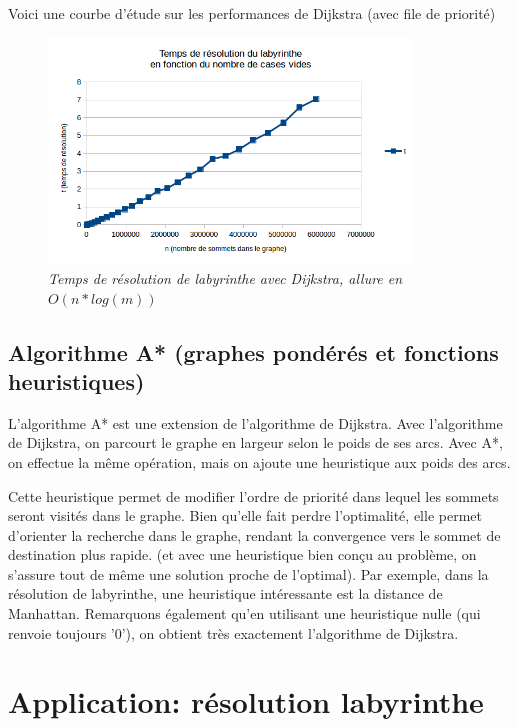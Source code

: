 \documentclass[10pt]{article}
\begin{document}
				Voici une courbe d'étude sur les performances de Dijkstra (avec file de priorité)
				\begin{figure}[H]
					\begin{center}
						\includegraphics[height=6cm,keepaspectratio]{./images/courbe_temps.png}
					\end{center}
					\caption{\textit{Temps de résolution de labyrinthe avec Dijkstra, allure en \(O(n * log(m))\)}}
					\label{courbe_temps}
				\end{figure}

		\subsection{Algorithme A* (graphes pondérés et fonctions heuristiques)}
			L'algorithme A* est une extension de l'algorithme de Dijkstra. Avec l'algorithme de Dijkstra, on parcourt
			le graphe en largeur selon le poids de ses arcs. Avec A*, on effectue la même opération,
			mais on ajoute une heuristique \cite{heuristique} aux poids des arcs.\newline
			
			Cette heuristique permet de modifier l'ordre de priorité dans lequel les sommets seront visités dans le graphe.
			Bien qu'elle fait perdre l'optimalité, elle permet d'orienter la recherche dans le graphe, rendant la convergence vers
			le sommet de destination plus rapide.
			(et avec une heuristique bien conçu au problème, on s'assure tout de même une solution proche de l'optimal).
			Par exemple, dans la résolution de labyrinthe, une heuristique intéressante est la distance de Manhattan. \cite{manhattan}			
			Remarquons également qu'en utilisant une heuristique nulle (qui renvoie toujours '0'),
			on obtient très exactement l'algorithme de Dijkstra.

	\section{Application: résolution labyrinthe}
	
\end{document}
